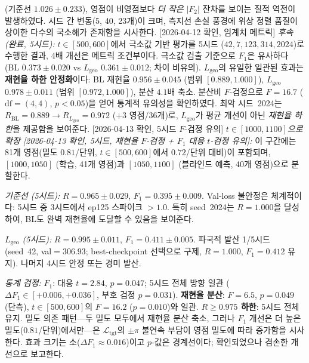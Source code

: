 \documentclass[11pt, a4paper]{article}
\theoremstyle{definition}
\theoremstyle{plain}
\newcommand{\Ltgt}{\mathcal{L}_{\mathrm{tgt}}}
\begin{document}
\begin{itemize}
        (기준선 $1.026\pm0.233$), 영점이 비영점보다
        \emph{더 작은} $|F_2|$ 잔차를 보이는 질적 역전이
        발생하였다. 시드 간 변동(5, 40, 23개)이 크며,
        측지선 손실 풍경에 위상 정렬 품질이 상이한
        다수의 국소해가 존재함을 시사한다.
        [2026-04-12 확인, 임계치 메트릭]
        \emph{후속 (완료, 5시드):}
        $t\in[500,600]$에서 극소값 기반 평가를 5시드
        ($42, 7, 123, 314, 2024$)로 수행한 결과,
        $4$배 개선은 메트릭 조건부이다.
        극소값 검출 기준으로 $F_1$은 유사하다
        (BL $0.373\pm0.020$ vs $L_{\mathrm{geo}}$
        $0.361\pm0.012$; 차이 비유의).
        $L_{\mathrm{geo}}$의 유일한 일관된 효과는
        \textbf{재현율 하한 안정화}이다:
        BL 재현율 $0.956\pm0.045$ (범위 $[0.889,1.000]$),
        $L_{\mathrm{geo}}$ $0.978\pm0.011$
        (범위 $[0.972,1.000]$), 분산 $4.1$배 축소.
        분산비 $F$-검정으로 $F=16.7$ ($\mathrm{df}=(4,4)$,
        $p<0.05$)을 얻어 통계적 유의성을 확인하였다.
        최악 시드~2024는
        $R_{\mathrm{BL}}=0.889\to R_{L_{\mathrm{geo}}}=0.972$
        ($+3$ 영점/36개)로, $L_{\mathrm{geo}}$가 평균 개선이
        아닌 \emph{재현율 하한}을 제공함을 보여준다.
        [2026-04-13 확인, 5시드
        $F$-검정 유의]
        \emph{$t\in[1000{,}1100]$으로 확장
        [2026-04-13 확인, 5시드,
        재현율 $F$-검정 + $F_1$ 대응 $t$-검정 유의]:}
        이 구간에는 81개 영점(밀도 $0.81$/단위,
        $t\in[500,600]$에서 $0.72$/단위 대비)이 포함되며,
        $[1000,1050]$ (학습, 41개 영점)과 $[1050,1100]$
        (블라인드 예측, 40개 영점)으로 분할한다.

        \smallskip\noindent
        \emph{기준선 (5시드):}
        $R{=}0.965\pm0.029$, $F_1{=}0.395\pm0.009$.
        Val-loss 불안정은 체계적이다: 5시드 중 3시드에서
        ep125 스파이크 $>1.0$.
        특히 seed~2024는 $R{=}1.000$을 달성하여, BL도
        완벽 재현율에 도달할 수 있음을 보여준다.

        \smallskip\noindent
        \emph{$L_{\mathrm{geo}}$ (5시드):}
        $R{=}0.995\pm0.011$, $F_1{=}0.411\pm0.005$.
        파국적 발산 1/5시드 (seed~42, val$=306.93$;
        best-checkpoint 선택으로 구제,
        $R{=}1.000$, $F_1{=}0.412$ 유지).
        나머지 4시드 안정 또는 경미 발산.

        \smallskip\noindent
        \emph{통계 검정:}
        \textbf{$F_1$}: 대응 $t{=}2.84$, $p{=}0.047$;
        5시드 전체 방향 일관
        ($\Delta F_1 \in [+0.006, +0.036]$,
        부호 검정 $p{=}0.031$).
        \textbf{재현율 분산}: $F{=}6.5$, $p{=}0.049$
        (단측), $t\in[500,600]$의 $F{=}16.2$ ($p{=}0.010$)와 일관.
        \textbf{$R{\ge}0.975$ 하한}: 5시드 전체 유지.
        밀도 의존 패턴---두 밀도 모두에서 재현율 분산 축소,
        그러나 $F_1$ 개선은 더 높은 밀도($0.81$/단위)에서만---은
        $\Ltgt$의 $\pm\pi$ 불연속 부담이 영점 밀도에 따라
        증가함을 시사한다.
        효과 크기는 소($\Delta F_1 \approx 0.016$)이고
        $p$-값은 경계선이다; 확인되었으나 겸손한 개선으로
        보고한다.
\end{itemize}
\end{document}
